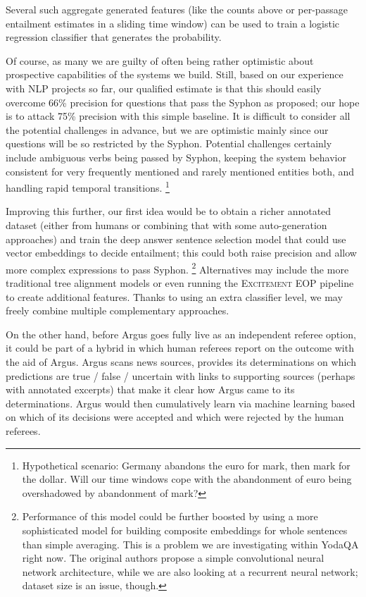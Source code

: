 \documentclass[11pt,a4paper]{article}
\begin{document}
Several such aggregate generated features (like the counts above or
per-passage entailment estimates in a sliding time window) can be used
to train a logistic regression classifier that generates the probability.

Of course, as many we are guilty of often being rather optimistic about
prospective capabilities of the systems we build.
Still, based on our experience with NLP projects so far, our qualified estimate
is that this should easily overcome 66\% precision for questions that
pass the Syphon as proposed; our hope is to attack 75\% precision with
this simple baseline.  It is difficult to consider all the potential
challenges in advance, but we are optimistic mainly since our questions
will be so restricted by the Syphon.  Potential challenges certainly include
ambiguous verbs being passed by Syphon, keeping the system behavior consistent
for very frequently mentioned and rarely mentioned entities both, and handling
rapid temporal transitions.%
\footnote{Hypothetical scenario: Germany abandons the euro for mark,
then mark for the dollar.  Will our time windows cope with the abandonment
of euro being overshadowed by abandonment of mark?}

Improving this further, our first idea would be to obtain a richer annotated
dataset (either from humans or combining that with some auto-generation
approaches) and train the deep answer sentence selection model \citep{Yu2014Deep}
that could use vector embeddings to decide entailment; this could both
raise precision and allow more complex expressions to pass Syphon.%
\footnote{Performance of this model could be further boosted by using
a more sophisticated model for building composite embeddings for whole sentences than simple averaging.
This is a problem we are investigating within YodaQA right now.
The original authors propose a simple convolutional neural network architecture,
while we are also looking at a recurrent neural network; dataset size is an issue, though.}
Alternatives may include the more traditional tree alignment models or even
running the \textsc{Excitement EOP} pipeline to create additional features.
Thanks to using an extra classifier level, we may freely
combine multiple complementary approaches.

On the other hand, before Argus goes fully live as an independent referee option, it could be part of a hybrid in
which human referees report on the outcome with the aid of Argus.  Argus scans news sources,
provides its determinations on which predictions are true / false / uncertain with links to
supporting sources (perhaps with annotated excerpts) that make it clear how Argus came to its
determinations. Argus would then cumulatively learn via machine learning based on which of its
decisions were accepted and which were rejected by the human referees.
\end{document}
